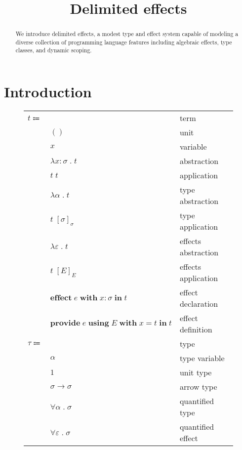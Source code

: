 \documentclass[12pt]{article}
\title{Delimited effects}
\date{}
\newcommand\eterm{t}
\newcommand\eunit{()}
\newcommand\evar{x}
\newcommand\eabs[2]{\lambda #1 \; . \; #2} %
\newcommand\eapp[2]{#1 \; #2}
\newcommand\eeffect[4]{\textbf{effect} \; #1 \; \textbf{with} \; \tanno{#2}{#3} \; \textbf{in} \; #4}
\newcommand\eprovide[5]{\textbf{provide} \; #1 \; \textbf{using} \; #2 \; \textbf{with} \; #3 = #4 \; \textbf{in} \; #5}
\newcommand\etabs[2]{\lambda #1 \; . \; #2} %
\newcommand\exabs[2]{\lambda #1 \; . \; #2} %
\newcommand\etapp[2]{#1 \; \left[#2\right]_{\tx}}
\newcommand\exapp[2]{#1 \; \left[#2\right]_{\xeffects}}
\newcommand\ttype{\tau}
\newcommand\tunit{1}
\newcommand\tvar{\alpha}
\newcommand\tarrow[2]{#1 \rightarrow #2} %
\newcommand\tanno[2]{#1 : #2} %
\newcommand\tx{\sigma}
\newcommand\tforall[2]{\forall #1 \; . \; #2} %
\newcommand\xeffect{e}
\newcommand\xvar{\varepsilon}
\newcommand\xeffects{E}
\newcommand\xforall[2]{\forall #1 \; . \; #2} %
\begin{document}
  \maketitle

  \begin{abstract}
    We introduce delimited effects, a modest type and effect system capable of modeling a diverse collection of programming language features including algebraic effects, type classes, and dynamic scoping.
  \end{abstract}

  \section{Introduction}

  \begin{figure}
    \begin{mdframed}[backgroundcolor=none]
      \begin{center}
        \begin{tabular}{l l l}
          $\eterm \Coloneqq $ & & term \\
          & $\eunit$ & unit \\
          & $\evar$ & variable \\
          & $\eabs{\tanno{\evar}{\tx}}{\eterm}$ & abstraction \\
          & $\eapp{\eterm}{\eterm}$ & application \\
          & $\etabs{\tvar}{\eterm}$ & type abstraction \\
          & $\etapp{\eterm}{\tx}$ & type application \\
          & $\exabs{\xvar}{\eterm}$ & effects abstraction \\
          & $\exapp{\eterm}{\xeffects}$ & effects application \\
          & $\eeffect{\xeffect}{\evar}{\tx}{\eterm}$ & effect declaration \\
          & $\eprovide{\xeffect}{\xeffects}{\evar}{\eterm}{\eterm}$ & effect definition \\
          $\ttype \Coloneqq$ & & type \\
          & $\tvar$ & type variable \\
          & $\tunit$ & unit type \\
          & $\tarrow{\tx}{\tx}$ & arrow type \\
          & $\tforall{\tvar}{\tx}$ & quantified type \\
          & $\xforall{\xvar}{\tx}$ & quantified effect \\

\end{tabular}
\end{center}
\end{mdframed}
\end{figure}
\end{document}
